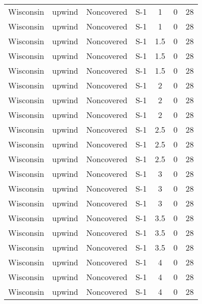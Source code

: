 \documentclass{article}
\begin{document}
\begin{longtable}[c]{ccccccc}
Wisconsin & upwind    & Noncovered & S-1             & 1            & 0           & 28  \\
Wisconsin & upwind    & Noncovered & S-1             & 1            & 0           & 28  \\
Wisconsin & upwind    & Noncovered & S-1             & 1.5          & 0           & 28  \\
Wisconsin & upwind    & Noncovered & S-1             & 1.5          & 0           & 28  \\
Wisconsin & upwind    & Noncovered & S-1             & 1.5          & 0           & 28  \\
Wisconsin & upwind    & Noncovered & S-1             & 2            & 0           & 28  \\
Wisconsin & upwind    & Noncovered & S-1             & 2            & 0           & 28  \\
Wisconsin & upwind    & Noncovered & S-1             & 2            & 0           & 28  \\
Wisconsin & upwind    & Noncovered & S-1             & 2.5          & 0           & 28  \\
Wisconsin & upwind    & Noncovered & S-1             & 2.5          & 0           & 28  \\
Wisconsin & upwind    & Noncovered & S-1             & 2.5          & 0           & 28  \\
Wisconsin & upwind    & Noncovered & S-1             & 3            & 0           & 28  \\
Wisconsin & upwind    & Noncovered & S-1             & 3            & 0           & 28  \\
Wisconsin & upwind    & Noncovered & S-1             & 3            & 0           & 28  \\
Wisconsin & upwind    & Noncovered & S-1             & 3.5          & 0           & 28  \\
Wisconsin & upwind    & Noncovered & S-1             & 3.5          & 0           & 28  \\
Wisconsin & upwind    & Noncovered & S-1             & 3.5          & 0           & 28  \\
Wisconsin & upwind    & Noncovered & S-1             & 4            & 0           & 28  \\
Wisconsin & upwind    & Noncovered & S-1             & 4            & 0           & 28  \\
Wisconsin & upwind    & Noncovered & S-1             & 4            & 0           & 28  \\

\end{longtable}
\end{document}
